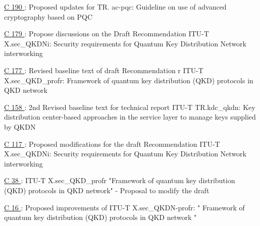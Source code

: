 \href{https://www.itu.int/md/meetingdoc.asp?lang=en\&parent=T25-SG17-C-0190}{C 190 }: Proposed updates for TR. ac-pqc: Guideline on use of advanced cryptography based on PQC

\href{https://www.itu.int/md/meetingdoc.asp?lang=en\&parent=T25-SG17-C-0179}{C 179 }: Propose discussions on the Draft Recommendation ITU-T X.sec\_QKDNi: Security requirements for Quantum Key Distribution Network interworking

\href{https://www.itu.int/md/meetingdoc.asp?lang=en\&parent=T25-SG17-C-0177}{C 177 }: Revised baseline text of draft Recommendation r ITU-T X.sec\_QKD\_profr: Framework of quantum key distribution (QKD) protocols in QKD network

\href{https://www.itu.int/md/meetingdoc.asp?lang=en\&parent=T25-SG17-C-0158}{C 158 }: 2nd Revised baseline text for technical report ITU-T TR.kdc\_qkdn: Key distribution center-based approaches in the service layer to manage keys supplied by QKDN

\href{https://www.itu.int/md/meetingdoc.asp?lang=en\&parent=T25-SG17-C-0117}{C 117 }: Proposed modifications for the draft Recommendation ITU-T X.sec\_QKDNi: Security requirements for Quantum Key Distribution Network interworking

\href{https://www.itu.int/md/meetingdoc.asp?lang=en\&parent=T25-SG17-C-0038}{C 38 }: ITU-T X.sec\_QKD\_profr "Framework of quantum key distribution (QKD) protocols in QKD network" - Proposal to modify the draft

\href{https://www.itu.int/md/meetingdoc.asp?lang=en\&parent=T25-SG17-C-0016}{C 16 }: Proposed improvements of ITU-T X.sec\_QKDN-profr: " Framework of quantum key distribution (QKD) protocols in QKD network "
